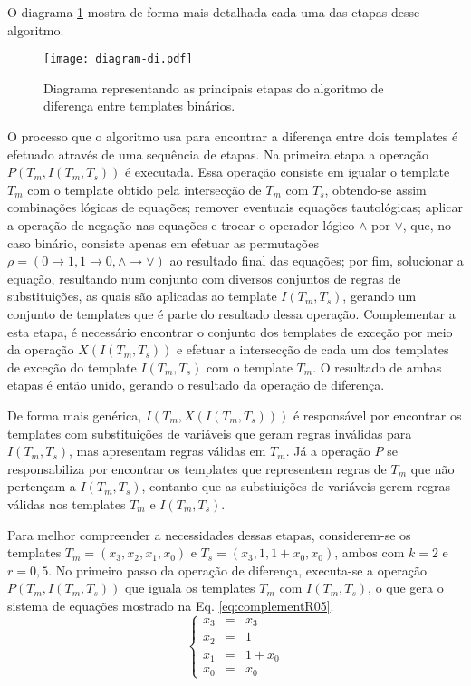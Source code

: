 O diagrama \ref{fig:diagramInter} mostra de forma mais detalhada cada uma das etapas desse algoritmo.
\begin{figure}[h!]
  \centering
  \texttt{[image: diagram-di.pdf]}
  \caption{Diagrama representando as principais etapas do algoritmo de diferença entre templates binários.}
  \label{fig:diagramInter}
\end{figure}    

O processo que o algoritmo usa para encontrar a diferença entre dois templates é efetuado através de uma sequência de etapas. Na primeira etapa a operação $P(T_m, I(T_m, T_s))$ é executada. Essa operação consiste em igualar o template $T_m$ com o template obtido pela intersecção de $T_m$ com $T_s$, obtendo-se assim combinações lógicas de equações; remover eventuais equações tautológicas; aplicar a operação de negação nas equações e trocar o operador lógico $\wedge$ por $\vee$, que, no caso binário, consiste apenas em efetuar as permutações $\rho = (0 \rightarrow 1, 1 \rightarrow 0, \wedge \rightarrow \vee)$ ao resultado final das equações; por fim, solucionar a equação, resultando num conjunto com diversos conjuntos de regras de substituições, as quais são aplicadas ao template $I(T_m, T_s)$, gerando um conjunto de templates que é parte do resultado dessa operação. Complementar a esta etapa, é necessário encontrar o conjunto dos templates de exceção por meio da operação $X(I(T_m, T_s))$ e efetuar a intersecção de cada um dos templates de exceção do template $I(T_m, T_s)$ com o template $T_m$. O resultado de ambas etapas é então unido, gerando o resultado da operação de diferença.

De forma mais genérica, $I(T_m, X(I(T_m, T_s)))$ é responsável por encontrar os templates com substituições de variáveis que geram regras inválidas para $I(T_m, T_s)$, mas apresentam regras válidas em $T_m$. Já a operação $P$ se responsabiliza por encontrar os templates que representem regras de $T_m$ que não pertençam a $I(T_m, T_s)$, contanto que as substiuições de variáveis gerem regras válidas nos templates $T_m$ e $I(T_m, T_s)$.

Para melhor compreender a necessidades dessas etapas, considerem-se os templates $T_m = (x_3, x_2, x_1, x_0)$ e $T_s = (x_3, 1, 1 + x_0, x_0)$, ambos com $k=2$ e $r=0,5$. No primeiro passo da operação de diferença, executa-se a operação $P(T_m, I(T_m, T_s))$ que iguala os templates $T_m$ com $I(T_m, T_s)$, o que gera o sistema de equações mostrado na Eq. \eqref{eq:complementR05}.
\begin{equation}
\left\{\begin{matrix}
x_3 & = & x_3	\\ 
x_2 & = & 1	\\ 
x_1 & = & 1+x_0	\\ 
x_0 & = & x_0
\end{matrix}\right.
\label{eq:complementR05}
\end{equation}

